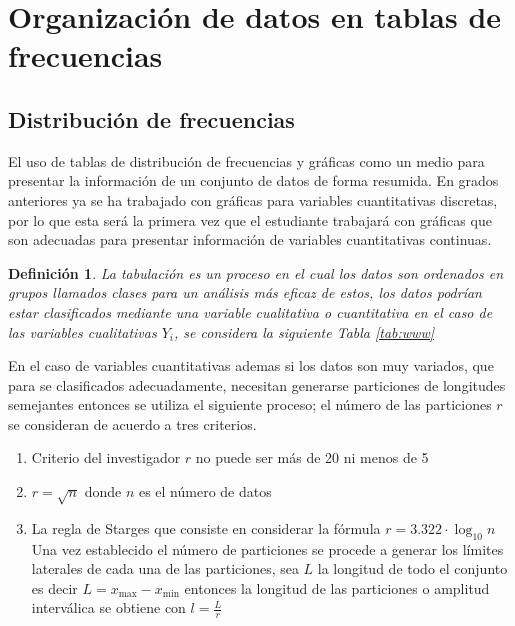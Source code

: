 \documentclass[a4paper]{report}
\newtheorem{defn}[thm]{Definición}
\begin{document}
\section{Organización de datos en tablas de frecuencias}
\subsection{Distribución de frecuencias}
El uso de tablas de distribución de frecuencias y gráficas como un medio para presentar la información
de un conjunto de datos de forma resumida. En grados anteriores ya se ha trabajado con gráficas para
variables cuantitativas discretas, por lo que esta será la primera vez que el estudiante trabajará con
gráficas que son adecuadas para presentar información de variables cuantitativas continuas.

\begin{defn}
	La tabulación es un proceso en el cual los datos son ordenados en grupos llamados clases para un análisis más eficaz de estos, los datos podrían estar clasificados mediante una variable cualitativa o cuantitativa en el caso de las variables cualitativas $Y_i$, se considera la siguiente Tabla \ref{tab:www}
\end{defn}


En el caso de variables cuantitativas ademas si los datos son muy variados, que para se clasificados adecuadamente, necesitan generarse particiones de longitudes semejantes entonces se utiliza el siguiente proceso; el número de las particiones $r$ se consideran de acuerdo a tres criterios.
\begin{enumerate}
	\item Criterio del investigador $r$ no puede ser más de 20 ni menos de 5
	\item $r=\sqrt{n}$ donde $n$ es el número de datos
	\item La regla de Starges que consiste en considerar la fórmula $r=3.322\cdot\log_{10} n$ Una vez establecido el número de particiones se procede a generar los límites laterales de cada una de las particiones, sea $L$ la longitud de todo el conjunto es decir $L=x_{\text{max}}-x_{\text{min}}$ entonces la longitud de las particiones o amplitud interválica se obtiene con $l=\frac{L}{r}$
\end{enumerate}
\end{document}
